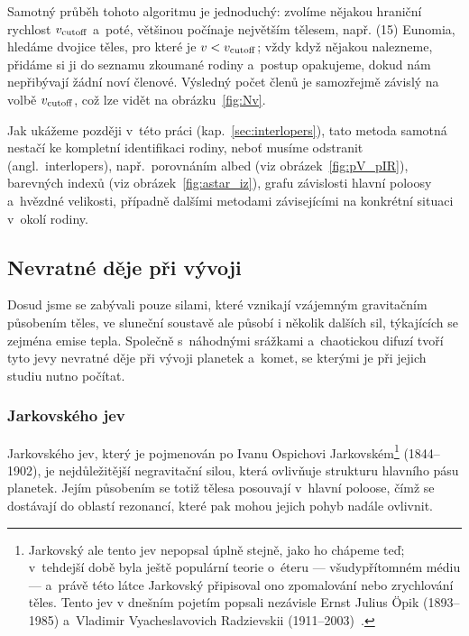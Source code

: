 \documentclass[A4paper, 12pt, oneside]{book}
\begin{document}
Samotný průběh tohoto algoritmu je jednoduchý: zvolíme nějakou hraniční rychlost $v_{\rm cutoff}$ a~poté, většinou počínaje největším tělesem, např. (15) Eunomia, hledáme dvojice těles, pro které je $v<v_{\rm cutoff}$; vždy když nějakou nalezneme, přidáme si ji do seznamu zkoumané rodiny a~postup opakujeme, dokud nám nepřibývají žádní noví členové. Výsledný počet členů je samozřejmě závislý na volbě $v_{\rm cutoff}$, což lze vidět na obrázku~\ref{fig:Nv}.

Jak ukážeme později v~této práci (kap.~\ref{sec:interlopers}), tato metoda samotná nestačí ke kompletní identifikaci rodiny, neboť musíme odstranit  (angl.\ interlopers), např.\ porovnáním albed (viz obrázek~\ref{fig:pV_pIR}), barevných indexů (viz obrázek~\ref{fig:astar_iz}), grafu závislosti hlavní poloosy a~hvězdné velikosti, případně dalšími metodami závisejícími na konkrétní situaci v~okolí rodiny.

\subsection{Nevratné děje při vývoji}

Dosud jsme se zabývali pouze silami, které vznikají vzájemným gravitačním působením těles, ve sluneční soustavě ale působí i několik dalších sil, týkajících se zejména emise tepla. Společně s~náhodnými srážkami a~chaotickou difuzí tvoří tyto jevy nevratné děje při vývoji planetek a~komet, se kterými je při jejich studiu nutno počítat.

\subsubsection{Jarkovského jev} \label{sec:jarko}
Jarkovského jev, který je pojmenován po Ivanu Ospichovi Jarkovském\footnote{Jarkovský ale tento jev nepopsal úplně stejně, jako ho chápeme teď; v~tehdejší době byla ještě populární teorie o~éteru --- všudypřítomném médiu --- a~právě této látce Jarkovský připisoval ono zpomalování nebo zrychlování těles. Tento jev v dnešním pojetím popsali nezávisle Ernst Julius Öpik (1893--1985) a~Vladimir Vyacheslavovich Radzievskii (1911--2003)~\cite{brozphd}.}  (1844--1902), je nejdůležitější negravitační silou, která ovlivňuje strukturu hlavního pásu planetek. Jejím působením se totiž tělesa posouvají v~hlavní poloose, čímž se dostávají do oblastí rezonancí, které pak mohou jejich pohyb nadále ovlivnit.
\end{document}
